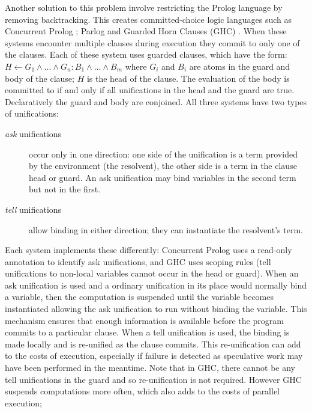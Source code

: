 Another solution to this problem involve restricting the Prolog language
by removing backtracking.
This creates committed-choice logic languages such as
Concurrent Prolog \citep*{saraswat86:concurrent_prolog_definition,
taylor:flat_concur_prolog};
Parlog \citep*{clark:84:parlog_sys_prog,clark:86:parlog}
and Guarded Horn Clauses (GHC) \citep*{ueda:ghc}.
When these systems encounter multiple clauses during execution they commit
to only one of the clauses.
Each of these system uses guarded clauses, which have the
form:
$H \leftarrow G_1 \wedge \ldots \wedge G_n : B_1 \wedge \ldots \wedge B_m$
where $G_i$ and $B_i$ are atoms in the guard and body of the
clause;
$H$ is the head of the clause.
The evaluation of the body is committed to if and only if 
all unifications in the head and the guard are true.
Declaratively the guard and body are conjoined.
All three systems have two types of unifications:
\begin{description}
    \item[\emph{ask} unifications] occur only in one direction:
    one side of the unification is a term provided by the
    environment (the resolvent),
    the other side is a term in the clause head or guard.
    An ask unification may bind variables in the second term but not in the
    first.

    \item[\emph{tell} unifications] allow binding in either direction;
    they can instantiate the resolvent's term.
\end{description}
Each system implements these differently:
Concurrent Prolog uses a read-only annotation to identify ask unifications,
and GHC uses scoping rules
(tell unifications to non-local variables cannot occur in the head or
guard).
When an ask unification is used and 
a ordinary unification in its place would normally bind a variable,
then the computation is suspended until the variable becomes instantiated
allowing the ask unification to run without binding the variable.
This mechanism ensures that enough information is available before the
program commits to a particular clause.
When a tell unification is used,
the binding is made locally and is re-unified as the clause commits.
This re-unification can add to the costs of execution,
especially if failure is detected as speculative work may have been
performed in the meantime.
Note that in GHC,
there cannot be any tell unifications in the guard and so re-unification is
not required.
However GHC suspends computations more often,
which also adds to the costs of parallel execution;
